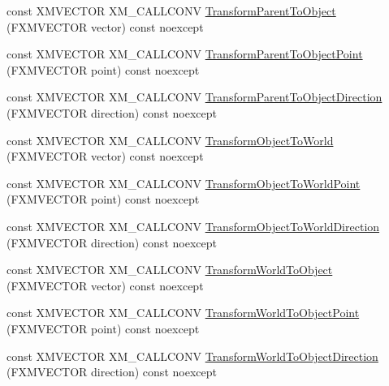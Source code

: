 \begin{DoxyCompactItemize}
\item 
const X\+M\+V\+E\+C\+T\+OR X\+M\+\_\+\+C\+A\+L\+L\+C\+O\+NV \hyperlink{structmage_1_1_transform_node_aa649804646f82257522c5136f0d4d2a0}{Transform\+Parent\+To\+Object} (F\+X\+M\+V\+E\+C\+T\+OR vector) const noexcept
\item 
const X\+M\+V\+E\+C\+T\+OR X\+M\+\_\+\+C\+A\+L\+L\+C\+O\+NV \hyperlink{structmage_1_1_transform_node_afb966684b63c5e24845fa93a53802b5f}{Transform\+Parent\+To\+Object\+Point} (F\+X\+M\+V\+E\+C\+T\+OR point) const noexcept
\item 
const X\+M\+V\+E\+C\+T\+OR X\+M\+\_\+\+C\+A\+L\+L\+C\+O\+NV \hyperlink{structmage_1_1_transform_node_ab7c1a1559d407f36deb342095b37e7b9}{Transform\+Parent\+To\+Object\+Direction} (F\+X\+M\+V\+E\+C\+T\+OR direction) const noexcept
\item 
const X\+M\+V\+E\+C\+T\+OR X\+M\+\_\+\+C\+A\+L\+L\+C\+O\+NV \hyperlink{structmage_1_1_transform_node_a93cad83498de7702b0c888260862ec39}{Transform\+Object\+To\+World} (F\+X\+M\+V\+E\+C\+T\+OR vector) const noexcept
\item 
const X\+M\+V\+E\+C\+T\+OR X\+M\+\_\+\+C\+A\+L\+L\+C\+O\+NV \hyperlink{structmage_1_1_transform_node_a0cd8cd0683c141f2632d96bb3c155614}{Transform\+Object\+To\+World\+Point} (F\+X\+M\+V\+E\+C\+T\+OR point) const noexcept
\item 
const X\+M\+V\+E\+C\+T\+OR X\+M\+\_\+\+C\+A\+L\+L\+C\+O\+NV \hyperlink{structmage_1_1_transform_node_aacbb3c43db6a7b67170654e1ffc70892}{Transform\+Object\+To\+World\+Direction} (F\+X\+M\+V\+E\+C\+T\+OR direction) const noexcept
\item 
const X\+M\+V\+E\+C\+T\+OR X\+M\+\_\+\+C\+A\+L\+L\+C\+O\+NV \hyperlink{structmage_1_1_transform_node_a20d7ef8d49095a4ffddf508cad7d89d1}{Transform\+World\+To\+Object} (F\+X\+M\+V\+E\+C\+T\+OR vector) const noexcept
\item 
const X\+M\+V\+E\+C\+T\+OR X\+M\+\_\+\+C\+A\+L\+L\+C\+O\+NV \hyperlink{structmage_1_1_transform_node_a792410956cd6577f3f840341d152ca8a}{Transform\+World\+To\+Object\+Point} (F\+X\+M\+V\+E\+C\+T\+OR point) const noexcept
\item 
const X\+M\+V\+E\+C\+T\+OR X\+M\+\_\+\+C\+A\+L\+L\+C\+O\+NV \hyperlink{structmage_1_1_transform_node_aac30202006ee4ccc2b9e05adb145656b}{Transform\+World\+To\+Object\+Direction} (F\+X\+M\+V\+E\+C\+T\+OR direction) const noexcept
\end{DoxyCompactItemize}
